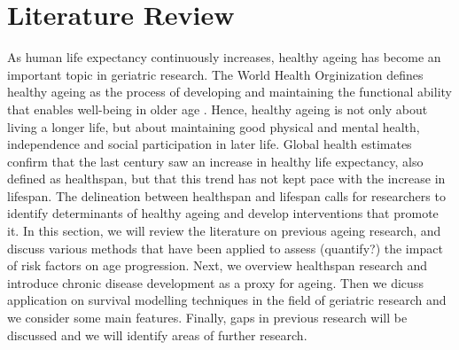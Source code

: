 \chapter{Literature Review}
\label{chap:lit_review} 

As human life expectancy continuously increases, healthy ageing has become an important topic in geriatric research. The World Health Orginization defines healthy ageing as the process of developing and maintaining the functional ability that enables well-being in older age \citep{WHO}. Hence, healthy ageing is not only about living a longer life, but about maintaining good physical and mental health, independence and social participation in later life. Global health estimates confirm that the last century saw an increase in healthy life expectancy, also defined as healthspan, but that this trend has not kept pace with the increase in lifespan. The delineation between healthspan and lifespan calls for researchers to identify determinants of healthy ageing and develop interventions that promote it. In this section, we will review the literature on previous ageing research, and discuss various methods that have been applied to assess (quantify?) the impact of risk factors on age progression. Next, we overview healthspan research and introduce chronic disease development as a proxy for ageing. Then we dicuss application on survival modelling techniques in the field of geriatric research and we consider some main features. Finally, gaps in previous research will be discussed and we will identify areas of further research. %



